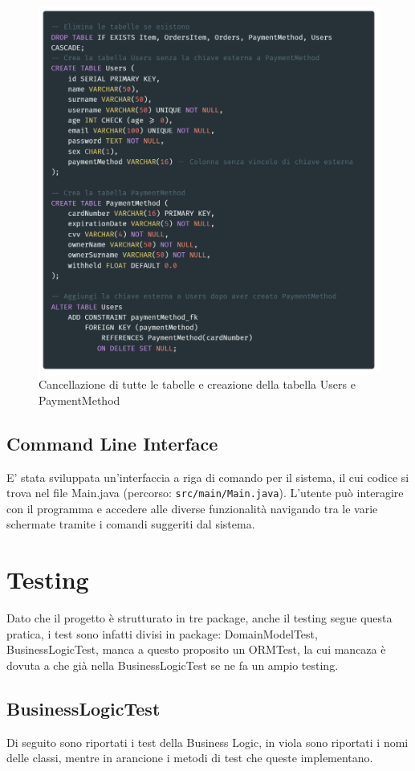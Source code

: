 \documentclass{article}
\begin{document}
\begin{figure}[h]
    \includegraphics[width=0.8\linewidth]{imgs/snippets/Code_SQLReset.png}
    \centering
    \caption{Cancellazione di tutte le tabelle e creazione della tabella Users e PaymentMethod}
    \label{code_SQLReset}
\end{figure}

\subsection{Command Line Interface}
E' stata sviluppata un’interfaccia a riga di comando per il sistema, il cui codice si trova nel file Main.java (percorso: \texttt{src/main/Main.java}). L’utente può interagire con il programma e accedere alle diverse funzionalità navigando tra le varie schermate tramite i comandi suggeriti dal sistema.


\newpage

\section{Testing}
Dato che il progetto è strutturato in tre package, anche il testing segue questa pratica, i test sono infatti divisi in package: DomainModelTest, BusinessLogicTest, manca a questo proposito un ORMTest, la cui mancaza è dovuta a che già nella BusinessLogicTest se ne fa un ampio testing. 


\subsection{BusinessLogicTest}
Di seguito sono riportati i test della Business Logic, in viola sono riportati i nomi delle classi, mentre in arancione i metodi di test che queste implementano.
\end{document}
